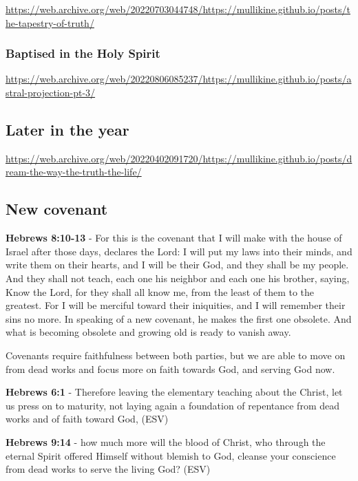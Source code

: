\documentclass[11pt]{article}
\begin{document}
\url{https://web.archive.org/web/20220703044748/https://mullikine.github.io/posts/the-tapestry-of-truth/}

\subsubsection{Baptised in the Holy Spirit}
\label{sec:orgcc544bb}
\url{https://web.archive.org/web/20220806085237/https://mullikine.github.io/posts/astral-projection-pt-3/}

\subsection{Later in the year}
\label{sec:orged7157f}
\url{https://web.archive.org/web/20220402091720/https://mullikine.github.io/posts/dream-the-way-the-truth-the-life/}

\subsection{New covenant}
\label{sec:orgc992f5f}
\textbf{Hebrews 8:10-13} - For this is the covenant that I will make with the house of Israel after those days, declares the Lord: I will put my laws into their minds, and write them on their hearts, and I will be their God, and they shall be my people. And they shall not teach, each one his neighbor and each one his brother, saying, Know the Lord, for they shall all know me, from the least of them to the greatest. For I will be merciful toward their iniquities, and I will remember their sins no more. In speaking of a new covenant, he makes the first one obsolete. And what is becoming obsolete and growing old is ready to vanish away.

Covenants require faithfulness between both parties, but we are able to move on from dead works and focus more on faith towards God, and serving God now.

\textbf{Hebrews 6:1} - Therefore leaving the elementary teaching about the Christ, let us press on to maturity, not laying again a foundation of repentance from dead works and of faith toward God, (ESV)

\textbf{Hebrews 9:14} - how much more will the blood of Christ, who through the eternal Spirit offered Himself without blemish to God, cleanse your conscience from dead works to serve the living God? (ESV)
\end{document}
